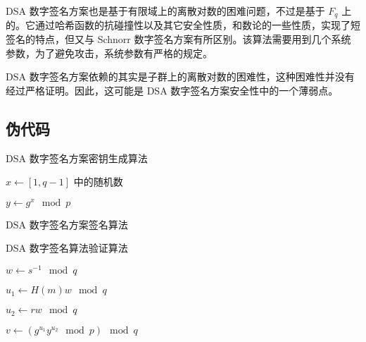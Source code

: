 \documentclass[12pt,a4paper]{article}
\begin{document}
DSA 数字签名方案也是基于有限域上的离散对数的困难问题，不过是基于 $ F_q $ 上的。它通过哈希函数的抗碰撞性以及其它安全性质，和数论的一些性质，实现了短签名的特点，但又与 Schnorr 数字签名方案有所区别。该算法需要用到几个系统参数，为了避免攻击，系统参数有严格的规定。

DSA 数字签名方案依赖的其实是子群上的离散对数的困难性，这种困难性并没有经过严格证明。因此，这可能是 DSA 数字签名方案安全性中的一个薄弱点。

\subsection*{伪代码}

\begin{algorithm}[H]
\caption{DSA 数字签名方案密钥生成算法}

$ x \leftarrow [1, q - 1] $ 中的随机数

$ y \leftarrow g^x \mod p $

\end{algorithm}

\begin{algorithm}[H]
\caption{DSA 数字签名方案签名算法}

\end{algorithm}

\begin{algorithm}[H]
\caption{DSA 数字签名算法验证算法}


$ w \leftarrow s^{-1} \mod q $

$ u_1 \leftarrow H(m) w \mod q $

$ u_2 \leftarrow r w \mod q $

$ v \leftarrow (g^{u_1} y^{u_2} \mod p) \mod q $

{
}
\end{algorithm}
\end{document}
